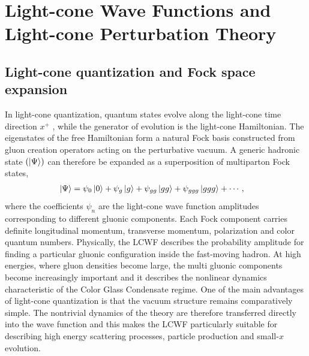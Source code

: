 \documentclass[a4paper,11pt]{article}
\begin{document}
\section{Light-cone Wave Functions and Light-cone Perturbation Theory} \label{sec:LCWFLCPT}
\subsection{Light-cone quantization and Fock space expansion} \label{sec:LCquant}
In light-cone quantization, quantum states evolve along the light-cone time direction $x^{+}$ , while the generator of evolution is the light-cone Hamiltonian. The eigenstates of the free Hamiltonian form a natural Fock basis constructed from gluon creation operators acting on the perturbative vacuum. A generic hadronic state $(\ket{\Psi})$ can therefore be expanded as a superposition of multiparton Fock states,
\begin{align} \label{eq: LCQuant}
\ket{\Psi} & = \psi_{0}\ket{0} + \psi_{g}\ket{g} +
\psi_{gg}\ket{gg} + \psi_{ggg}\ket{ggg} +\cdots,
\end{align}
where the coefficients $\psi_{n}$ are the light-cone wave function amplitudes corresponding to different gluonic components. Each Fock component carries definite longitudinal momentum, transverse momentum, polarization and color quantum numbers. Physically, the LCWF describes the probability amplitude for finding a particular gluonic configuration inside the fast-moving hadron. At high energies, where gluon densities become large, the multi gluonic components become increasingly important and it describes the nonlinear dynamics characteristic of the Color Glass Condensate regime. One of the main advantages of light-cone quantization is that the vacuum structure remains comparatively simple. The nontrivial dynamics of the theory are therefore transferred directly into the wave function and this makes the LCWF particularly suitable for describing high energy scattering processes, particle production and small-$x$ evolution. 
\end{document}
